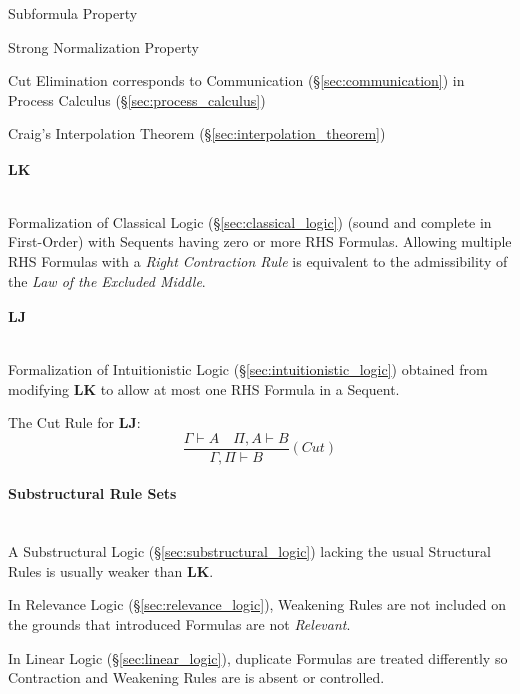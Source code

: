 Subformula Property %

Strong Normalization Property

Cut Elimination corresponds to Communication
(\S\ref{sec:communication}) in Process Calculus
(\S\ref{sec:process_calculus})

Craig's Interpolation Theorem (\S\ref{sec:interpolation_theorem})



\paragraph{$\mathbf{LK}$}\label{sec:lk} \hfill \\

Formalization of Classical Logic (\S\ref{sec:classical_logic})
(sound and complete in First-Order) with Sequents having zero or more
RHS Formulas. Allowing multiple RHS Formulas with a \emph{Right
  Contraction Rule} is equivalent to the admissibility of the
\emph{Law of the Excluded Middle}.



\paragraph{$\mathbf{LJ}$}\label{sec:lj} \hfill \\

Formalization of Intuitionistic Logic
(\S\ref{sec:intuitionistic_logic}) obtained from modifying
$\mathbf{LK}$ to allow at most one RHS Formula in a Sequent.

The Cut Rule for $\mathbf{LJ}$:
\[
  \frac{
    \Gamma \vdash A \quad \Pi, A \vdash B
  }{
    \Gamma, \Pi \vdash B
  }(Cut)
\]



\paragraph{Substructural Rule Sets}\label{sec:substructural_rule}
\hfill \\

A Substructural Logic (\S\ref{sec:substructural_logic}) lacking the
usual Structural Rules is usually weaker than $\mathbf{LK}$.

In Relevance Logic (\S\ref{sec:relevance_logic}), Weakening Rules
are not included on the grounds that introduced Formulas are not
\emph{Relevant}.

In Linear Logic (\S\ref{sec:linear_logic}), duplicate Formulas are
treated differently so Contraction and Weakening Rules are is absent
or controlled.



